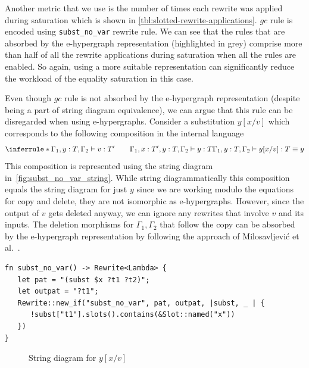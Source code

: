 Another metric that we use is the number of times each rewrite was applied during saturation which is shown in \autoref{tbl:slotted-rewrite-applications}.
$gc$ rule is encoded using \texttt{subst\_no\_var} rewrite rule.
We can see that the rules that are absorbed by the e-hypergraph representation (highlighted in grey) comprise more than half of all the rewrite applications during saturation when all the rules are enabled.
So again, using a more suitable representation can significantly reduce the workload of the equality saturation in this case.

\begin{remark}
Even though $gc$ rule is not absorbed by the e-hypergraph representation (despite being a part of string diagram equivalence), we can argue that this rule can be disregarded when using e-hypergraphs.
Consider a substitution $y[x / v]$ which corresponds to the following composition in the internal language
\[
\inferrule*{\Gamma_1,y : T, \Gamma_2 \vdash v : T' \qquad \Gamma_1, x : T', y : T, \Gamma_2 \vdash y : T}{
	\Gamma_1, y : T, \Gamma_2 \vdash y[x / v] : T \equiv y
}
\]
This composition is represented using the string diagram in~\autoref{fig:subst_no_var_string}.
While string diagrammatically this composition equals the string diagram for just $y$ since we are working modulo the equations for copy and delete, they are not isomorphic as e-hypergraphs.
However, since the output of $v$ gets deleted anyway, we can ignore any rewrites that involve $v$ and its inputs.
The deletion morphisms for $\Gamma_1, \Gamma_2$ that follow the copy can be absorbed by the e-hypergraph representation by following the approach of Milosavljevi\'{c} et al.~\cite{zanassi_comonoid}.
\end{remark}

\begin{listing}
	\begin{verbatim}
fn subst_no_var() -> Rewrite<Lambda> {
   let pat = "(subst $x ?t1 ?t2)";
   let outpat = "?t1";
   Rewrite::new_if("subst_no_var", pat, outpat, |subst, _ | {
      !subst["t1"].slots().contains(&Slot::named("x"))
   })
}
	\end{verbatim}
	\caption{$\lambda_{\text{lsub}}$ $gc$-rule}
	\label{listing:gc_rule}
\end{listing}


\begin{figure}
	\centering
	\caption{String diagram for $y[x/v]$}
	\label{fig:subst_no_var_string}
\end{figure}

